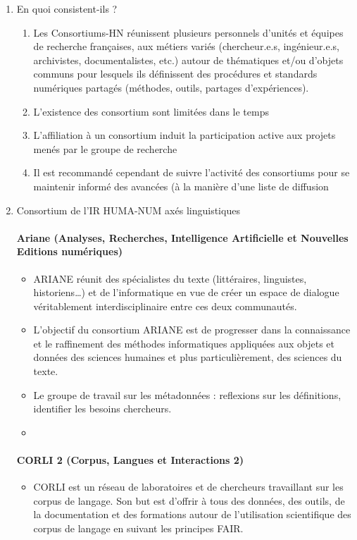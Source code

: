 \documentclass{book}
\newenvironment{titlemize}[1]{%
  \paragraph{#1}
  \begin{itemize}}
  {\end{itemize}}
\begin{document}
\begin{enumerate}
	\item En quoi consistent-ils ?
        \begin{enumerate}
            \item Les Consortiums-HN réunissent plusieurs personnels d’unités et équipes de recherche françaises, aux métiers variés (chercheur.e.s, ingénieur.e.s, archivistes, documentalistes, etc.)  autour de thématiques et/ou d’objets communs pour lesquels ils définissent des procédures et standards numériques partagés (méthodes, outils, partages d’expériences).
            \item L'existence des consortium sont limitées dans le temps
            \item L'affiliation à un consortium induit la participation active aux projets menés par le groupe de recherche
            \item Il est recommandé cependant de suivre l'activité des consortiums pour se maintenir informé des avancées (à la manière d'une liste de diffusion
        \end{enumerate}
	\item Consortium de l'IR HUMA-NUM axés linguistiques
        \begin{titlemize}{Ariane (Analyses, Recherches, Intelligence Artificielle et Nouvelles Editions numériques)}
            \item ARIANE réunit des spécialistes du texte (littéraires, linguistes, historiens…) et de l’informatique en vue de créer un espace de dialogue véritablement interdisciplinaire entre ces deux communautés.
            \item L’objectif du consortium ARIANE est de progresser dans la connaissance et le raffinement des méthodes informatiques appliquées aux objets et données des sciences humaines et plus particulièrement, des sciences du texte.
            \item Le groupe de travail sur les métadonnées : reflexions sur les définitions, identifier les besoins chercheurs.
            \item 
        \end{titlemize}
        \begin{titlemize}{CORLI 2 (Corpus, Langues et Interactions 2)}
            \item CORLI est un réseau de laboratoires et de chercheurs travaillant sur les corpus de langage. Son but est d’offrir à tous des données, des outils, de la documentation et des formations autour de l’utilisation scientifique des corpus de langage en suivant les principes FAIR.

\end{titlemize}
\end{enumerate}
\end{document}
